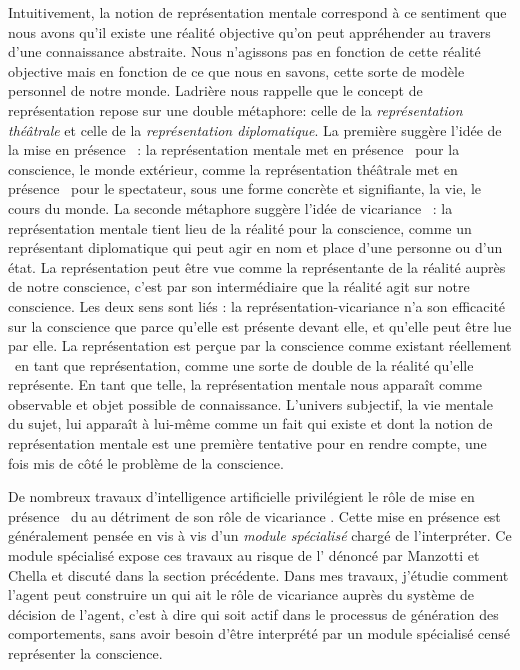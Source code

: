 Intuitivement, la notion de représentation mentale correspond à ce sentiment que nous avons qu’il existe une réalité objective qu’on peut appréhender au travers d’une connaissance abstraite. 
Nous n’agissons pas en fonction de cette réalité objective mais en fonction de ce que nous en savons, cette sorte de modèle personnel de notre monde. 
Ladrière \cite{ladriere_representation_1999} nous rappelle que le concept de représentation repose sur une double métaphore: celle de la \emph{représentation théâtrale} et celle de la \emph{représentation diplomatique}. 
La première suggère l'idée de la \og mise en présence \fg\ : la représentation mentale \og met en présence \fg\ pour la conscience, le monde extérieur, comme la représentation théâtrale \og met en présence \fg\ pour le spectateur, sous une forme concrète et signifiante, la vie, le cours du monde. 
La seconde métaphore suggère l'idée de \og vicariance \fg\ : la représentation mentale tient lieu de la réalité pour la conscience, comme un représentant diplomatique qui peut agir en nom et place d’une personne ou d’un état. 
La représentation peut être vue comme la représentante de la réalité auprès de notre conscience, c'est par son intermédiaire que la réalité agit sur notre conscience.
Les deux sens sont liés : la représentation-vicariance n'a son efficacité sur la conscience que parce qu’elle est présente \og devant elle\fg, et qu’elle peut être lue par elle. 
La représentation est perçue par la conscience comme \og existant réellement \fg\ en tant que représentation, comme une sorte de double de la réalité qu’elle représente. 
En tant que telle, la représentation mentale nous apparaît comme observable et objet possible de connaissance. 
L’univers subjectif, la vie mentale du sujet, lui apparaît à lui-même comme un fait qui existe et dont la notion de représentation mentale est une première tentative pour en rendre compte, une fois mis de côté le problème de la conscience. 

De nombreux travaux d'intelligence artificielle privilégient le rôle de \og mise en présence  \fg\ du  au détriment de son rôle de \og vicariance \fg{}. 
Cette mise en présence est généralement pensée en vis à vis d'un \emph{module spécialisé} chargé de l'interpréter.
Ce module spécialisé expose ces travaux au risque de l' dénoncé par Manzotti et Chella  et discuté dans la section précédente. 
Dans mes travaux, j'étudie comment l'agent peut construire un  qui ait le rôle de vicariance auprès du système de décision de l'agent, c'est à dire qui soit actif dans le processus de génération des comportements, sans avoir besoin d'être interprété par un module spécialisé censé représenter la conscience. 



